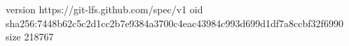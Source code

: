 version https://git-lfs.github.com/spec/v1
oid sha256:7448b62c5c2d1cc2b7e9384a3700c4eac43984c993d699d1df7a8ccbf32f6990
size 218767
